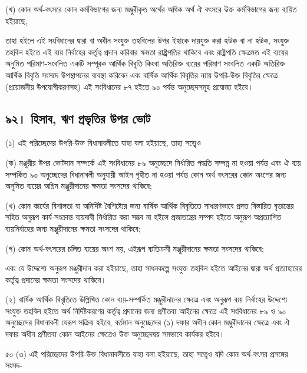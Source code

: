 \documentclass[11pt]{article}
\begin{document}
(খ) কোন অর্থ-বৎসরে কোন কর্মবিভাগের জন্য মঞ্জুরীকৃত অর্থের অধিক অর্থ ঐ বৎসরে
    উক্ত কর্মবিভাগের জন্য ব্যয়িত হইয়াছে,

তাহা হইলে এই সংবিধানের দ্বারা বা অধীন সংযুক্ত তহবিলের উপর ইহাকে দায়যুক্ত
করা হউক বা না হউক, সংযুক্ত তহবিল হইতে এই ব্যয় নির্বাহের কর্তৃত্ব প্রদান করিবার
ক্ষমতা রাষ্ট্রপতির থাকিবে এবং রাষ্ট্রপতি ক্ষেত্রমত এই ব্যয়ের অনুমিত
পরিমাণ-সংবলিত একটি সম্পূরক আর্থিক বিবৃতি কিংবা অতিরিক্ত ব্যয়ের পরিমাণ সংবলিত
একটি অতিরিক্ত আর্থিক বিবৃতি সংসদে উপস্থাপনের ব্যবস্থা করিবেন এবং বার্ষিক
আর্থিক বিবৃতির ন্যায় উপরি-উক্ত বিবৃতির ক্ষেত্রে (প্রয়োজনীয় উপযোগীকরণসহ) এই
সংবিধানের ৮৭ হইতে ৯০ পর্যন্ত অনুচ্ছেদসমূহ প্রযোজ্য হইবে।

\subsection{৯২। হিসাব, ঋণ প্রভৃতির উপর ভোট}
\label{sec:org87340ce}
(১) এই পরিচ্ছেদের উপরি-উক্ত বিধানাবলীতে যাহা বলা হইয়াছে, তাহা সত্ত্বেও

(ক) মঞ্জুরীর উপর ভোটদান সম্পর্কে এই সংবিধানের ৮৯ অনুচ্ছেদে নির্ধারিত পদ্ধতি
    সম্পন্ন না হওয়া পর্যন্ত এবং ঐ ব্যয় সম্পর্কিত ৯০ অনুচ্ছেদের বিধানাবলী অনুযায়ী আইন
    গৃহীত না হওয়া পর্যন্ত কোন অর্থ বৎসরের কোন অংশের জন্য অনুমিত ব্যয়ের অগ্রিম
    মঞ্জুরীদানের ক্ষমতা সংসদের থাকিবে;

(খ) কোন কার্যের বিশালতা বা অনির্দিষ্ট বৈশিষ্ট্যের জন্য বার্ষিক আর্থিক বিবৃতিতে
    সাধারণভাবে প্রদত্ত বিস্তারিত বৃত্তান্তের সহিত অনুরূপ কার্য-সংক্রান্ত ব্যয়দাবী
    নির্ধারিত করা সম্ভব না হইলে প্রজাতন্ত্রের সম্পদ হইতে অনুরূপ অপ্রত্যাশিত
    ব্যয়নির্বাহের জন্য মঞ্জুরীদানের ক্ষমতা সংসদের থাকিবে;

(গ) কোন অর্থ-বৎসরের চলিত ব্যয়ের অংশ নয়, এইরূপ ব্যতিক্রমী মঞ্জুরীদানের ক্ষমতা
    সংসদের থাকিবে;

এবং যে উদ্দেশ্যে অনুরূপ মঞ্জুরীদান করা হইয়াছে, তাহা সাধনকল্পে সংযুক্ত তহবিল
হইতে আইনের দ্বারা অর্থ প্রত্যাহারের কর্তৃত্ব প্রদানের ক্ষমতা সংসদের থাকিবে।

(২) বার্ষিক আর্থিক বিবৃতিতে উল্লিখিত কোন ব্যয়-সম্পর্কিত মঞ্জুরীদানের ক্ষেত্রে এবং
    অনুরূপ ব্যয় নির্বাহের উদ্দেশ্যে সংযুক্ত তহবিল হইতে অর্থ নির্দিষ্টকরণের কর্তৃত্ব
    প্রদানের জন্য প্রণীতব্য আইনের ক্ষেত্রে এই সংবিধানের ৮৯ ও ৯০ অনুচ্ছেদের
    বিধানাবলী যেরূপ সক্রিয় হইবে, বর্তমান অনুচ্ছেদের (১) দফার অধীন কোন
    মঞ্জুরীদানের ক্ষেত্রে এবং ঐ দফার অধীন প্রণীতব্য কোন আইনের ক্ষেত্রেও উক্ত
    অনুচ্ছেদদ্বয় সমভাবে কার্যকর হইবে।

৫০ (৩) এই পরিচ্ছেদের উপরি-উক্ত বিধানাবলীতে যাহা বলা হইয়াছে, তাহা সত্ত্বেও
যদি কোন অর্থ-বৎসর প্রসঙ্গের সংসদ-
\end{document}
